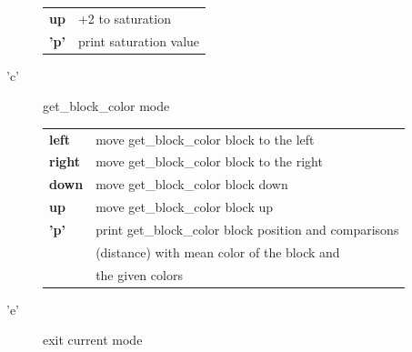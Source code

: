 \begin{description}
\begin{tabular}{ll}
                {\bf up   } & +2 to saturation \\
                {\bf 'p'  } & print saturation value \\
            \end{tabular}
        \item['c'] get\_block\_color mode \\
            \begin{tabular}{ll} 
                {\bf left } & move get\_block\_color block to the left  \\
                {\bf right} & move get\_block\_color block to the right \\
                {\bf down } & move get\_block\_color block down \\
                {\bf up   } & move get\_block\_color block up \\
                {\bf 'p'  } & print get\_block\_color block position and 
                              comparisons \\
                            & (distance) with mean color of 
                              the block and \\
                            & the given colors
            \end{tabular}
        \item['e'] exit current mode
    \end{description}
